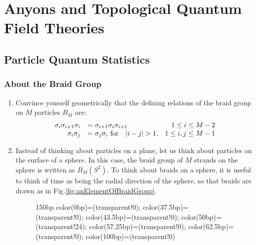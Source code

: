 \documentclass{book}
\begin{document}
\part{Anyons and Topological Quantum Field Theories}

\chapter{Particle Quantum Statistics}

\section{About the Braid Group}


\begin{enumerate}
\item Convince yourself geometrically that the defining relations of the braid group on $M$ particles $B_{M}$ are:\begin{equation}
\begin{array}{ r l r }
\sigma _{i} \sigma _{i+1} \sigma _{i} & =\sigma _{i+1} \sigma _{i} \sigma _{i+1} & 1\leq i\leq M-2\\
\sigma _{i} \sigma _{j} & =\sigma _{j} \sigma _{i}\text{ for } \ \ |i-j| >1, & 1\leq i,j\leq M-1
\end{array}
\label{eq:definingRelationsOfBraidGroup}
\end{equation}
\item Instead of thinking about particles on a plane, let us think about particles on the surface of a sphere. In this case, the braid group of $M$ strands on the sphere is written as $B_{M} (S^{2} )$. To think about braids on a sphere, it is useful to think of time as being the radial direction of the sphere, so that braids are drawn as in Fig.\ref{fig:anElementOfBraidGroup}.

\begin{figure}[h!]
\centering
{}
 {150bp} {color(0bp)=(transparent!0);
color(37.5bp)=(transparent!0);
color(43.5bp)=(transparent!0);
color(50bp)=(transparent!24);
color(57.25bp)=(transparent!0);
color(62.5bp)=(transparent!0);
color(100bp)=(transparent!0) } 


\end{figure}
\end{enumerate}
\end{document}
